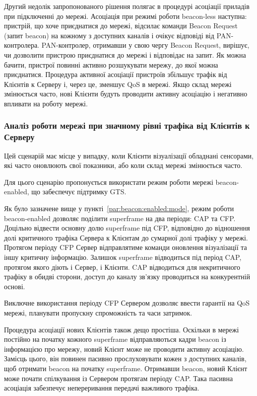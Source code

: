 \documentclass[a4paper,ukrainian,utf8,nocolumnsxix,floatsection,equationsection]{eskdtext}
\renewcommand\paragraph{\subsubsection}
\newcommand{\blm}[0]{beacon-less\xspace}
\newcommand{\bem}[0]{beacon-enabled\xspace}
\begin{document}
Другий недолік запропонованого рішення полягає в процедурі асоціації приладів при підключенні до мережі. Асоціація при режимі роботи \blm наступна: пристрій, що хоче приєднатися до мережі, відсилає команди Beacon Request (запит beacon) на кожному з доступних каналів і очікує відповіді від PAN-контролера. PAN-контролер, отримавши  у свою чергу Beacon Request, вирішує, чи дозволити пристрою приєднатися до мережі і відповідає на запит. Як можна бачити, пристрої повинні активно розшукувати мережу, до якої можна приєднатися. Процедура активної асоціації пристроїв збільшує трафік від Клієнтів к Серверу і, через це, зменшує QoS в мережі. Якщо склад мережі змінюється часто, нові Клієнти будуть проводити активну асоціацію і негативно впливати на роботу мережі.

\paragraph{Аналіз роботи мережі при значному рівні трафіка від Клієнтів к Серверу}
\label{par:high:ntht}

Цей сценарій має місце у випадку, коли Клієнти візуалізації обладнані сенсорами, які часто  оновлюють свої показники, або коли склад мережі змінюється часто.

Для цього сценарію пропонується використати режим роботи мережі \bem, що забеспечує підтримку GTS.

Як було зазначене вище у пункті~\ref{par:beacon:enabled:mode}, режим роботи \bem дозволяє поділити superframe на два періоди: CAP та CFP. Доцільно відвести основну долю superframe під CFP, відповідно до відношення долі критичного трафіка Сервера к Клієнтам до сумарної долі трафіку у мережі. Протягом періоду CFP Сервер відправлятиме команди оновлення візуалізації та іншу критичну інформацію. Залишок superframe відводиться під період CAP, протягом якого діють і Сервер, і Клієнти. CAP відводиться для некритичного трафіку в обидві сторони, доступ до каналу зв’язку проводиться на конкурентній основі. 

Виключне використання періоду CFP Сервером дозволяє ввести гарантії на QoS мережі, планувати пропускну спроможність та часи затримок. 

Процедура асоціації нових Клієнтів також дещо простіша. Оскільки в мережі постійно на початку кожного superframe відправляються кадри beacon із інформацією про мережу, новий Клієнт може не проводити активну асоціацію. Замісць цього, він повинен пасивно прослуховувати кожен з доступних каналів, щоб отримати beacon на початку superframe. Отримавши beacon, новий Клієнт може почати спілкування із Сервером протягам періоду CAP. Така пасивна асоціація забезпечує непереривання передачі важливого трафіка.
\end{document}
